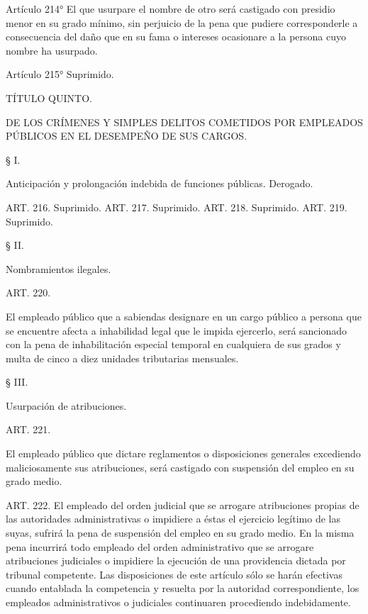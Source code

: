     Artículo 214° El que usurpare el nombre de otro será castigado con presidio menor en su grado mínimo, sin perjuicio de la pena que pudiere corresponderle a consecuencia del daño que en su fama o intereses ocasionare a la persona cuyo nombre ha usurpado.

    Artículo 215°  Suprimido.



    TÍTULO QUINTO.

DE LOS CRÍMENES Y SIMPLES DELITOS COMETIDOS POR EMPLEADOS PÚBLICOS EN EL DESEMPEÑO DE SUS CARGOS.


    § I.

    Anticipación y prolongación indebida de funciones públicas. Derogado.





    ART. 216. Suprimido.
    ART. 217. Suprimido.
    ART. 218. Suprimido.
    ART. 219. Suprimido.

    § II.

    Nombramientos ilegales.

    ART. 220.

    El empleado público que a sabiendas designare en un cargo público a persona que se encuentre afecta a inhabilidad legal que le impida ejercerlo, será sancionado con la pena de inhabilitación especial temporal en cualquiera de sus grados y multa de cinco a diez unidades tributarias mensuales.

    § III.

    Usurpación de atribuciones.


    ART. 221.

    El empleado público que dictare reglamentos o disposiciones generales excediendo maliciosamente sus atribuciones, será castigado con suspensión del empleo en su grado medio.


    ART. 222. El empleado del orden judicial que se arrogare atribuciones propias de las autoridades administrativas o impidiere a éstas el ejercicio legítimo de las suyas, sufrirá la pena de suspensión del empleo en su grado medio.
    En la misma pena incurrirá todo empleado del orden administrativo que se arrogare atribuciones judiciales o impidiere la ejecución de una providencia dictada por tribunal competente.
    Las disposiciones de este artículo sólo se harán efectivas cuando entablada la competencia y resuelta por la autoridad correspondiente, los empleados administrativos o judiciales continuaren procediendo indebidamente.



